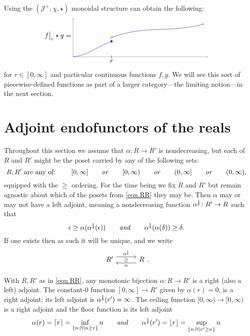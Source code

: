 \documentclass[11pt, one side, article]{memoir}
\newcommand{\adjpos}[6][30pt]{%
\begin{tikzcd}[ampersand replacement=\&, column sep=#1]
  #2\ar[r, shift left=4.5pt, "#3"]
  \ar[r, phantom, "\scriptstyle#6"]\&
  #5\ar[l, shift left=4.5pt, "#4"]
\end{tikzcd}
}
\theoremstyle{definition}
\theoremstyle{plain}
\newenvironment{example}
  {\pushQED{\qed}\renewcommand{\qedsymbol}{$\lozenge$}\examplex}
  {\popQED\endexamplex}
\DeclarePairedDelimiter{\floor}{\lfloor}{\rfloor}
\DeclarePairedDelimiter{\ceil}{\lceil}{\rceil}
\newcommand{\cat}[1]{\mathcal{#1}}%
\newcommand{\ldag}{^{\rotatebox{180}{$\dagger$}}}
\newcommand{\tn}[1]{\textnormal{#1}}
\newcommand{\nn}{\mathbb{N}}
\newcommand{\blank}[1][1pt]{\hspace{#1}\cdot\hspace{#1}}
\newcommand{\rest}[2][\blank]{#1\big|_{#2}}
\newcommand{\hh}[2][]{#1 \tn{\textit{#2}} #1}
\newcommand{\qqand}{\hh[\qquad]{and}}
\begin{document}
\begin{example}
Using the $(\cat{J}^+,\chi,\star)$ monoidal structure can obtain the following:
\begin{equation}\label{eqn.lowersemicont}
\rest[f]{r}\star g=
\begin{tikzpicture}[baseline=(cop)]
	\draw[->, very thin] (0, 0) -- (7, 0);
	\draw[->, very thin] (0, 0) -- (0, 2);
	\node (sm) at (2,0) {$\shortmid$};
	\node[below=1pt] at (sm) {$r$};
	\begin{scope}[blue!70!black]
  	\node[circle, draw, inner sep=1pt, fill] at (2,.8) (ccl) {};
  	\draw (0, 0) to[out=5, in=200] (ccl);
  	\node[circle, draw, inner sep=1pt] at (2,1) (cop) {};
  	\draw[->] (cop) to[out=20, in=195] (6.8, 1.7);
	\end{scope}
\end{tikzpicture}
\end{equation}
for $r\in[0,\infty]$ and particular continuous functions $f,g$. We will see this sort of piecewise-defined functions as part of a larger category---the limiting notion---in the next section.

\end{example}

\section{Adjoint endofunctors of the reals}

Throughout this section we assume that $\alpha\colon R\to R'$ is nondecreasing, but each of $R$ and $R'$ might be the poset carried by any of the following sets:
\begin{equation}\label{eqn.RR}
	R,R'\text{~are any of:~}\qquad
	[0,\infty]\hh[\qquad]{or}
	[0,\infty)\hh[\qquad]{or}
	(0,\infty]\hh[\qquad]{or}
	(0,\infty),
\end{equation}
equipped with the $\geq$ ordering. For the time being we fix $R$ and $R'$ but remain agnostic about which of the posets from \eqref{eqn.RR} they may be. Then $\alpha$ may or may not have a left adjoint, meaning a nondecreasing function $\alpha\ldag\colon R'\to R$ such that
\begin{equation}\label{eqn.unit_counit}
  \epsilon\geq\alpha(\alpha\ldag(\epsilon))
  \qqand
  \alpha\ldag(\alpha(\delta))\geq\delta.
\end{equation}
If one exists then as such it will be unique, and we write
\[
\adjpos{R'}{\alpha\ldag}{\alpha}{R}{\geq}.
\]


\begin{example}
With $R,R'$ as in \eqref{eqn.RR}, any monotonic bijection $\alpha\colon R\to R'$ is a right (also a left) adjoint. The constant-$0$ function $[0,\infty]\to R'$ given by $\alpha(r)=0$, is a right adjoint; its left adjoint is $\alpha\ldag(r')=\infty$. The ceiling function $[0,\infty)\to[0,\infty)$ is a right adjoint and the floor function is its left adjoint
\[
	\alpha(r)=\ceil{r}=\inf_{\{n:\nn\mid n\geq r\}}n
	\qqand
	\alpha\ldag(r')=\floor{r}=\sup_{\{n:\nn\mid r'\geq n\}}n
\]
\end{example}
\end{document}
